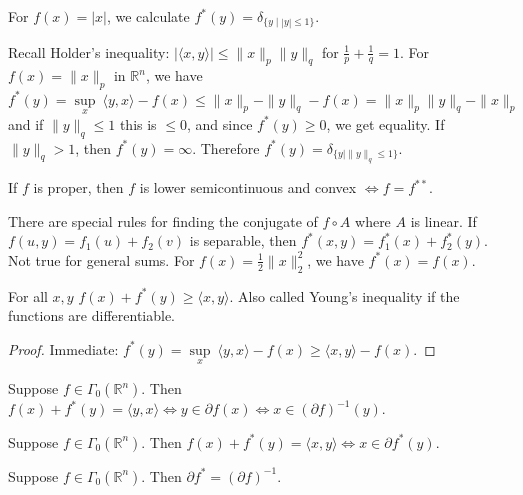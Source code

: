 \documentclass[english, 11pt]{article}
\begin{document}
 \begin{exmp}
 For $f(x) = |x|$, we calculate $f^*(y) = \delta_{\{ y \mid |y| \le 1 \} }$.
 \end{exmp}
 
 \begin{exmp}
 Recall Holder's inequality: $| \langle x,y \rangle | \le \|x\|_p \|y\|_q$ for $\frac{1}{p} + \frac{1}{q} =1$. For $f(x) = \|x\|_p$ in $\mathbb{R}^n$, we have 
 \[
 f^*(y) =  \sup \limits_x \ \langle y,x \rangle - f(x) \le \|x\|_p - \|y\|_q - f(x) = \|x\|_p \|y\|_q - \|x\|_p
 \]
 and if $\|y\|_q \le1$ this is $\le 0$, and since $f^*(y) \ge 0$, we get equality. If $\|y\|_q >1$, then $f^*(y) = \infty$. Therefore $f^*(y) = \delta_{ \{ y \mid \|y\|_q \le 1 \} }$.
 \end{exmp}
 
 \begin{thrm}
 If $f$ is proper, then $f$ is lower semicontinuous and convex $\iff f = f^{**}$.
 \end{thrm}
 
 \begin{rem}
 There are special rules for finding the conjugate of $f \circ A$ where $A$ is linear. If $f(u,y) = f_1(u) + f_2(v)$ is separable, then $f^*(x,y) = f_1^*(x) + f_2^*(y)$. Not true for general sums. For $f(x) = \frac{1}{2} \|x\|_2^2$, we have $f^*(x) = f(x)$.
 \end{rem}

\begin{thrm}
For all $x,y$ $f(x) + f^*(y) \ge \langle x,y \rangle$. Also called Young's inequality if the functions are differentiable.
\end{thrm}
\begin{proof} Immediate: 
$f^*(y) = \sup \limits_x \ \langle y,x \rangle - f(x) \ge \langle x,y \rangle - f(x)$.
\end{proof}

\begin{cor}
Suppose $f \in \Gamma_0(\mathbb{R}^n)$. Then
$f(x) + f^*(y) = \langle y,x \rangle  \iff y \in \partial f(x) \iff x \in (\partial f)^{-1}(y)$.
\end{cor}

\begin{cor}
Suppose $f \in \Gamma_0(\mathbb{R}^n)$. Then
$f(x) + f^*(y) = \langle x,y \rangle \iff x \in \partial f^*(y)$.
\end{cor}

\begin{cor}
Suppose $f \in \Gamma_0(\mathbb{R}^n)$. Then $\partial f^* = (\partial f)^{-1}$.
\end{cor}
\end{document}
